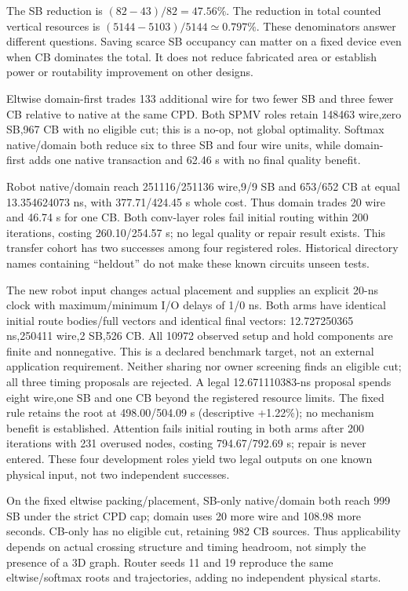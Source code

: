 \documentclass[conference,10pt]{IEEEtran}
\begin{document}
The SB reduction is $(82-43)/82=47.56\%$. The reduction in total counted vertical resources is $(5144-5103)/5144\simeq 0.797\%$. These denominators answer different questions. Saving scarce SB occupancy can matter on a fixed device even when CB dominates the total. It does not reduce fabricated area or establish power or routability improvement on other designs.

Eltwise domain-first trades 133 additional wire for two fewer SB and three fewer CB relative to native at the same CPD. Both SPMV roles retain 148463 wire,zero SB,967 CB with no eligible cut; this is a no-op, not global optimality. Softmax native/domain both reduce six to three SB and four wire units, while domain-first adds one native transaction and 62.46 s with no final quality benefit.

Robot native/domain reach 251116/251136 wire,9/9 SB and 653/652 CB at equal 13.354624073 ns, with 377.71/424.45 s whole cost. Thus domain trades 20 wire and 46.74 s for one CB. Both conv-layer roles fail initial routing within 200 iterations, costing 260.10/254.57 s; no legal quality or repair result exists. This transfer cohort has two successes among four registered roles. Historical directory names containing ``heldout'' do not make these known circuits unseen tests.

The new robot input changes actual placement and supplies an explicit 20-ns clock with maximum/minimum I/O delays of 1/0 ns. Both arms have identical initial route bodies/full vectors and identical final vectors: 12.727250365 ns,250411 wire,2 SB,526 CB. All 10972 observed setup and hold components are finite and nonnegative. This is a declared benchmark target, not an external application requirement. Neither sharing nor owner screening finds an eligible cut; all three timing proposals are rejected. A legal 12.671110383-ns proposal spends eight wire,one SB and one CB beyond the registered resource limits. The fixed rule retains the root at 498.00/504.09 s (descriptive +1.22\%); no mechanism benefit is established. Attention fails initial routing in both arms after 200 iterations with 231 overused nodes, costing 794.67/792.69 s; repair is never entered. These four development roles yield two legal outputs on one known physical input, not two independent successes.

On the fixed eltwise packing/placement, SB-only native/domain both reach 999 SB under the strict CPD cap; domain uses 20 more wire and 108.98 more seconds. CB-only has no eligible cut, retaining 982 CB sources. Thus applicability depends on actual crossing structure and timing headroom, not simply the presence of a 3D graph. Router seeds 11 and 19 reproduce the same eltwise/softmax roots and trajectories, adding no independent physical starts.
\end{document}
